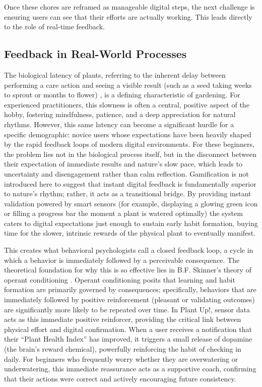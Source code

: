 Once these chores are reframed as manageable digital steps, the next challenge is ensuring users can see that their efforts are actually working. This leads directly to the role of real-time feedback.

\subsection{Feedback in Real-World Processes}
The biological latency of plants, referring to the inherent delay between performing a care action and seeing a visible result (such as a seed taking weeks to sprout or months to flower) \cite{gorillaPlantGrowth}, is a defining characteristic of gardening. For experienced practitioners, this slowness is often a central, positive aspect of the hobby, fostering mindfulness, patience, and a deep appreciation for natural rhythms. However, this same latency can become a significant hurdle for a specific demographic: novice users whose expectations have been heavily shaped by the rapid feedback loops of modern digital environments. For these beginners, the problem lies not in the biological process itself, but in the disconnect between their expectation of immediate results and nature's slow pace, which leads to uncertainty and disengagement rather than calm reflection. Gamification is not introduced here to suggest that instant digital feedback is fundamentally superior to nature's rhythm; rather, it acts as a transitional bridge. By providing instant validation powered by smart sensors (for example, displaying a glowing green icon or filling a progress bar the moment a plant is watered optimally) the system caters to digital expectations just enough to sustain early habit formation, buying time for the slower, intrinsic rewards of the physical plant to eventually manifest.

This creates what behavioral psychologists call a closed feedback loop, a cycle in which a behavior is immediately followed by a perceivable consequence. The theoretical foundation for why this is so effective lies in B.F. Skinner's theory of operant conditioning \cite{simplyPsychologyOperant}. Operant conditioning posits that learning and habit formation are primarily governed by consequences; specifically, behaviors that are immediately followed by positive reinforcement (pleasant or validating outcomes) are significantly more likely to be repeated over time. In Plant Up!, sensor data acts as this immediate positive reinforcer, providing the critical link between physical effort and digital confirmation. When a user receives a notification that their ``Plant Health Index'' has improved, it triggers a small release of dopamine (the brain's reward chemical), powerfully reinforcing the habit of checking in daily. For beginners who frequently worry whether they are overwatering or underwatering, this immediate reassurance acts as a supportive coach, confirming that their actions were correct and actively encouraging future consistency.

